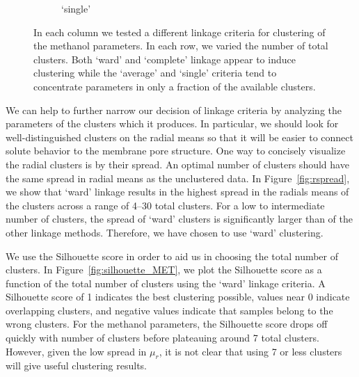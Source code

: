 \documentclass{article}
\begin{document}
\begin{figure}
\begin{subfigure}{0.24\textwidth}
  \caption{`single'}\label{fig:nclusters_single}
  \end{subfigure}
  \caption{In each column we tested a different linkage criteria for clustering
  of the methanol parameters. In each row, we varied the number of total clusters. 
  Both `ward' and `complete' linkage appear to induce clustering
  while the `average' and `single' criteria tend to concentrate parameters in
  only a fraction of the available clusters.}\label{fig:linkages}
  \end{figure}
  
  We can help to further narrow our decision of linkage criteria by analyzing 
  the parameters of the clusters which it produces. In particular, we should 
  look for well-distinguished clusters on the radial means so that it will be
  easier to connect solute behavior to the membrane pore structure. One way to
  concisely visualize the radial clusters is by their spread. An optimal number
  of clusters should have the same spread in radial means as the unclustered
  data. In Figure~\ref{fig:rspread}, we show that `ward' linkage results in 
  the highest spread in the radials means of the clusters across a range of
  4--30 total clusters. For a low to intermediate number of clusters, the 
  spread of `ward' clusters is significantly larger than of the other linkage
  methods. Therefore, we have chosen to use `ward' clustering.
  
  We use the Silhouette score in order to aid us in choosing the total number of
  clusters. In Figure~\ref{fig:silhouette_MET}, we plot the Silhouette score as
  a function of the total number of clusters using the `ward' linkage criteria. 
  A Silhouette score of 1 indicates the best clustering possible, values near
  0 indicate overlapping clusters, and negative values indicate that samples belong to
  the wrong clusters. For the methanol parameters, the Silhouette score drops off
  quickly with number of clusters before plateauing around 7 total clusters. 
  However, given the low spread in $\mu_r$, it is not clear that using 7 or less 
  clusters will give useful clustering results.
  
\end{document}
